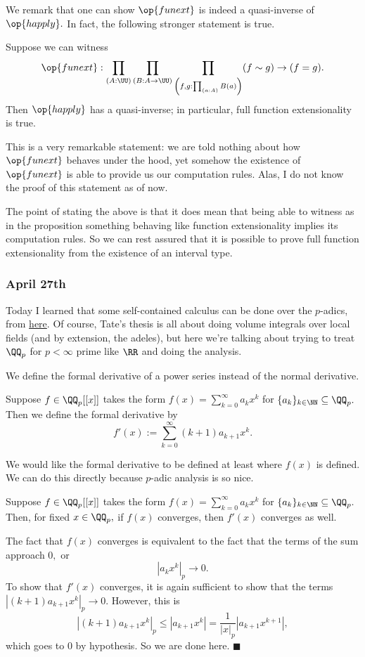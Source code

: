 We remark that one can show $\op{funext}$ is indeed a quasi-inverse of $\op{happly}.$ In fact, the following stronger statement is true.
\begin{proposition}
    Suppose we can witness
    \[\op{funext}:\prod_{(A:\UU)}\prod_{(B:A\to\UU)}\prod_{\left(f,g:\prod_{(a:A)}B(a)\right)}(f\sim g)\to(f=g).\]
    Then $\op{happly}$ has a quasi-inverse; in particular, full function extensionality is true.
\end{proposition}
This is a very remarkable statement: we are told nothing about how $\op{funext}$ behaves under the hood, yet somehow the existence of $\op{funext}$ is able to provide us our computation rules. Alas, I do not know the proof of this statement as of now.

The point of stating the above is that it does mean that being able to witness as in the proposition something behaving like function extensionality implies its computation rules. So we can rest assured that it is possible to prove full function extensionality from the existence of an interval type.

\subsubsection{April 27th}
Today I learned that some self-contained calculus can be done over the $p$-adics, from \href{http://swc-alpha.math.arizona.edu/video/2021/2021BellLecture5Notes.pdf}{here}. Of course, Tate's thesis is all about doing volume integrals over local fields (and by extension, the adeles), but here we're talking about trying to treat $\QQ_p$ for $p<\infty$ prime like $\RR$ and doing the analysis.

We define the formal derivative of a power series instead of the normal derivative.
\begin{definition}
    Suppose $f\in\QQ_p[[x]]$ takes the form $f(x)=\sum_{k=0}^\infty a_kx^k$ for $\{a_k\}_{k\in\NN}\subseteq\QQ_p.$ Then we define the formal derivative by
    \[f'(x):=\sum_{k=0}^\infty(k+1)a_{k+1}x^k.\]
\end{definition}
We would like the formal derivative to be defined at least where $f(x)$ is defined. We can do this directly because $p$-adic analysis is so nice.
\begin{lemma}
    Suppose $f\in\QQ_p[[x]]$ takes the form $f(x)=\sum_{k=0}^\infty a_kx^k$ for $\{a_k\}_{k\in\NN}\subseteq\QQ_p.$ Then, for fixed $x\in\QQ_p,$ if $f(x)$ converges, then $f'(x)$ converges as well.
\end{lemma}
The fact that $f(x)$ converges is equivalent to the fact that the terms of the sum approach $0,$ or
\[\left|a_kx^k\right|_p\to0.\]
To show that $f'(x)$ converges, it is again sufficient to show that the terms $\left|(k+1)a_{k+1}x^k\right|_p\to0.$ However, this is
\[\left|(k+1)a_{k+1}x^k\right|_p\le\left|a_{k+1}x^k\right|=\frac1{|x|_p}\left|a_{k+1}x^{k+1}\right|,\]
which goes to $0$ by hypothesis. So we are done here. $\blacksquare$

